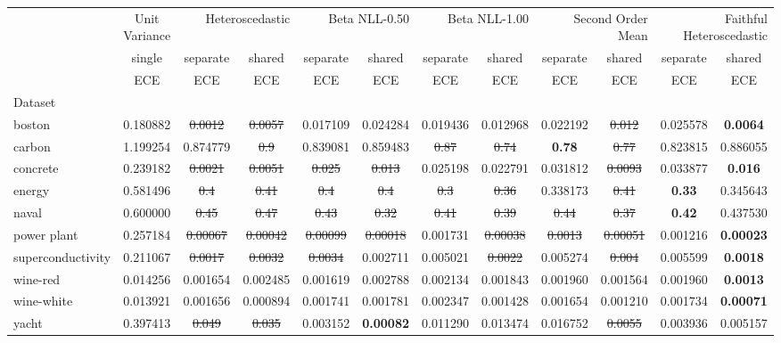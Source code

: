 \begin{tabular}{l|c|cc|cc|cc|cc|cc}
\toprule
{} & {Unit Variance} & \multicolumn{2}{r}{Heteroscedastic} & \multicolumn{2}{r}{Beta NLL-0.50} & \multicolumn{2}{r}{Beta NLL-1.00} & \multicolumn{2}{r}{Second Order Mean} & \multicolumn{2}{r}{Faithful Heteroscedastic} \\
{} & {single} & {separate} & {shared} & {separate} & {shared} & {separate} & {shared} & {separate} & {shared} & {separate} & {shared} \\
{} & {ECE} & {ECE} & {ECE} & {ECE} & {ECE} & {ECE} & {ECE} & {ECE} & {ECE} & {ECE} & {ECE} \\
{Dataset} & {} & {} & {} & {} & {} & {} & {} & {} & {} & {} & {} \\
\midrule
boston & 0.180882 & \sout{0.0012} & \sout{0.0057} & 0.017109 & 0.024284 & 0.019436 & 0.012968 & 0.022192 & \sout{0.012} & 0.025578 & \textbf{0.0064} \\
carbon & 1.199254 & 0.874779 & \sout{0.9} & 0.839081 & 0.859483 & \sout{0.87} & \sout{0.74} & \textbf{0.78} & \sout{0.77} & 0.823815 & 0.886055 \\
concrete & 0.239182 & \sout{0.0021} & \sout{0.0051} & \sout{0.025} & \sout{0.013} & 0.025198 & 0.022791 & 0.031812 & \sout{0.0093} & 0.033877 & \textbf{0.016} \\
energy & 0.581496 & \sout{0.4} & \sout{0.41} & \sout{0.4} & \sout{0.4} & \sout{0.3} & \sout{0.36} & 0.338173 & \sout{0.41} & \textbf{0.33} & 0.345643 \\
naval & 0.600000 & \sout{0.45} & \sout{0.47} & \sout{0.43} & \sout{0.32} & \sout{0.41} & \sout{0.39} & \sout{0.44} & \sout{0.37} & \textbf{0.42} & 0.437530 \\
power plant & 0.257184 & \sout{0.00067} & \sout{0.00042} & \sout{0.00099} & \sout{0.00018} & 0.001731 & \sout{0.00038} & \sout{0.0013} & \sout{0.00051} & 0.001216 & \textbf{0.00023} \\
superconductivity & 0.211067 & \sout{0.0017} & \sout{0.0032} & \sout{0.0034} & 0.002711 & 0.005021 & \sout{0.0022} & 0.005274 & \sout{0.004} & 0.005599 & \textbf{0.0018} \\
wine-red & 0.014256 & 0.001654 & 0.002485 & 0.001619 & 0.002788 & 0.002134 & 0.001843 & 0.001960 & 0.001564 & 0.001960 & \textbf{0.0013} \\
wine-white & 0.013921 & 0.001656 & 0.000894 & 0.001741 & 0.001781 & 0.002347 & 0.001428 & 0.001654 & 0.001210 & 0.001734 & \textbf{0.00071} \\
yacht & 0.397413 & \sout{0.049} & \sout{0.035} & 0.003152 & \textbf{0.00082} & 0.011290 & 0.013474 & 0.016752 & \sout{0.0055} & 0.003936 & 0.005157 \\
\bottomrule
\end{tabular}
